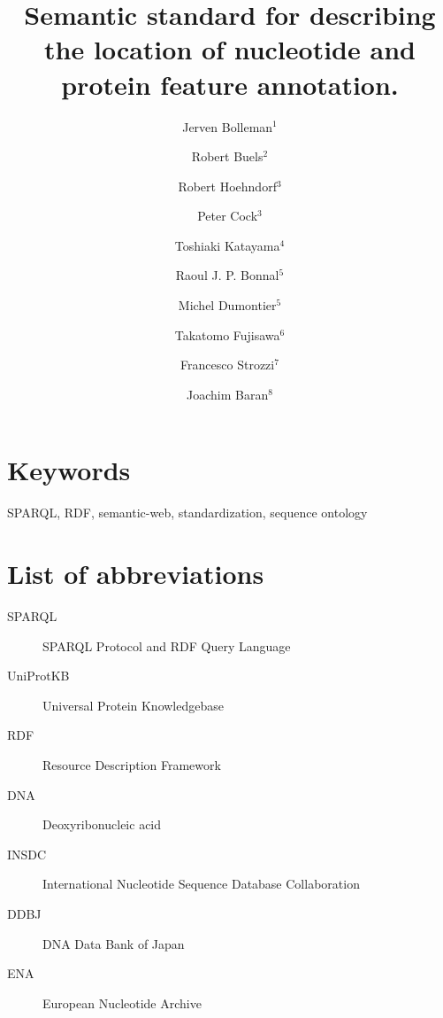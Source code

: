 \documentclass[10pt]{bmc_article}
\newenvironment{bmcformat}{\begin{raggedright}\baselineskip20pt\sloppy\setboolean{publ}{false}}{\end{raggedright}\baselineskip20pt\sloppy}
\begin{document}
\begin{bmcformat}
\title{Semantic standard for describing the location of nucleotide and protein feature annotation.}
\author{Jerven Bolleman\correspondingauthor$^1$%
    \and Robert Buels$^2$%
    \and Robert Hoehndorf$^3$%
    \and Peter Cock$^3$%
    \and Toshiaki Katayama$^4$%
    \and Raoul J. P. Bonnal$^5$%
    \and Michel Dumontier$^5$%
    \and Takatomo Fujisawa$^6$%
    \and Francesco Strozzi$^7$%
    \and Joachim Baran$^8$%
}
\address{
 \iid(1) SIB Swiss Institute of Bioinformatics, Centre Medical Universitaire, 1 rue Michel
Servet, 1211 Geneva 4, Switzerland,
 \iid(2) University of California, Berkeley, Berkeley, CA, USA,
 \iid(3) The James Hutton Institute, Dundee, DD2 5DA, UK,
 \iid(4) Database Center for Life Science, Research Organization of Information and Systems, 2-11-16, Yayoi, Bunkyo-ku, Tokyo, 113-0032, Japan,
 \iid(5) Integrative Biology Program, Istituto Nazionale Genetica Molecolare, Milan, Italy,
 \iid(6) Center for Information Biology, National Institute of Genetics, Research Organization of Information and Systems, 1111 Yata, Mishima, Shizuoka 411-08540, Japan,
 \iid(7) CeRSA, Parco Tecnologico Padano, Lodi 26900, Italy, and
 \iid(8) Ontario Institute for Cancer Research, 101 College Street, Suite 800, Toronto, Ontario, M5G 0A3, Canada.
}
\maketitle


\section*{Keywords}
SPARQL, RDF, semantic-web, standardization, sequence ontology









\section*{List of abbreviations}

\begin{description}
\item[SPARQL] SPARQL Protocol and RDF Query Language
\item[UniProtKB] Universal Protein Knowledgebase 
\item[RDF] Resource Description Framework
\item[DNA] Deoxyribonucleic acid
\item[INSDC] International Nucleotide Sequence Database Collaboration
\item[DDBJ] DNA Data Bank of Japan
\item[ENA] European Nucleotide Archive
\end{description}
\bigskip


\end{bmcformat}
\end{document}
